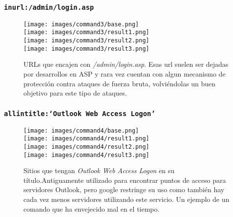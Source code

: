 \documentclass[11pt]{utalcaDoc}
\begin{document}
\subsubsection{\texttt{inurl:/admin/login.asp}}
\begin{figure}[H]
	\centering
\begin{multicols}{4}
	\texttt{[image: images/command3/base.png]}\\
	\texttt{[image: images/command3/result1.png]}\\
	\texttt{[image: images/command3/result2.png]}\\
	\texttt{[image: images/command3/result3.png]}\\
\end{multicols}
\caption{URLs que encajen con \textit{/admin/login.asp}. Esas url suelen ser dejadas por desarrollos en ASP y rara vez cuentan con algun mecanismo de protección contra ataques de fuerza bruta, volviéndolas un buen objetivo para este tipo de ataques.}
\label{FIG:command3}
\end{figure}


\subsubsection{\texttt{allintitle:\enquote*{Outlook Web Access Logon}}}
\begin{figure}[H]
	\centering
\begin{multicols}{4}
	\texttt{[image: images/command4/base.png]}\\
	\texttt{[image: images/command4/result1.png]}\\
	\texttt{[image: images/command4/result2.png]}\\
	\texttt{[image: images/command4/result3.png]}\\
\end{multicols}
\caption{Sitios que tengan \textit{Outlook Web Access Logon} en su título.Antiguamente utilizado para encontrar puntos de acceso para servidores Outlook, pero google restringe su uso como también hay cada vez menos servidores utilizando este servicio. Un ejemplo de un comando que ha envejecido mal en el tiempo.}
\label{FIG:command4}
\end{figure}
\end{document}

